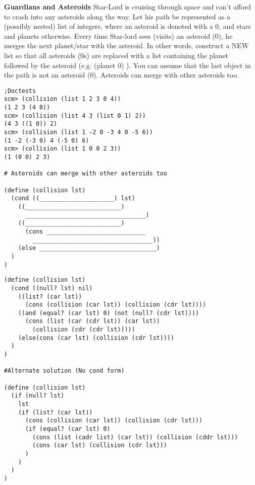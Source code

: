 \begin{blocksection}
\question
\textbf{Guardians and Asteroids}
Star-Lord is cruising through space and can’t afford to crash into any asteroids along the way. Let his path be represented as a (possibly nested) list of integers, where an asteroid is denoted with a 0, and stars and planets otherwise. Every time Star-lord sees (visits) an asteroid (0), he merges the next planet/star with the asteroid. In other words, construct a NEW list so that all asteroids (0s) are replaced with a list containing the planet followed by the asteroid (e.g. (planet 0) ). You can assume that the last object in the path is not an asteroid (0). Asteroids can merge with other asteroids too.
\\
\begin{lstlisting}
;Doctests
scm> (collision (list 1 2 3 0 4))
(1 2 3 (4 0))
scm> (collision (list 4 3 (list 0 1) 2))
(4 3 ((1 0)) 2)
scm> (collision (list 1 -2 0 -3 4 0 -5 6))
(1 -2 (-3 0) 4 (-5 0) 6)
scm> (collision (list 1 0 0 2 3))
(1 (0 0) 2 3) 

# Asteroids can merge with other asteroids too

(define (collision lst)
  (cond ((_____________________) lst)
    ((___________________________)
      __________________________________)
    ((___________________________)
      (cons ____________________________
        __________________________________))
    (else _________________________________)
  )
)

\end{lstlisting}
\end{blocksection}

\begin{solution}
\begin{blocksection}
\begin{lstlisting}
(define (collision lst)
  (cond ((null? lst) nil)
    ((list? (car lst))
      (cons (collision (car lst)) (collision (cdr lst))))
    ((and (equal? (car lst) 0) (not (null? (cdr lst))))
      (cons (list (car (cdr lst)) (car lst))
        (collision (cdr (cdr lst)))))
    (else(cons (car lst) (collision (cdr lst))))
  )
)

#Alternate solution (No cond form)

(define (collision lst)
  (if (null? lst)
    lst
    (if (list? (car lst))
      (cons (collision (car lst)) (collision (cdr lst)))
      (if (equal? (car lst) 0)
        (cons (list (cadr list) (car lst)) (collision (cddr lst)))
        (cons (car lst) (collision (cdr lst)))
      )
    )
  )
)
\end{lstlisting}
\end{blocksection}
\end{solution}